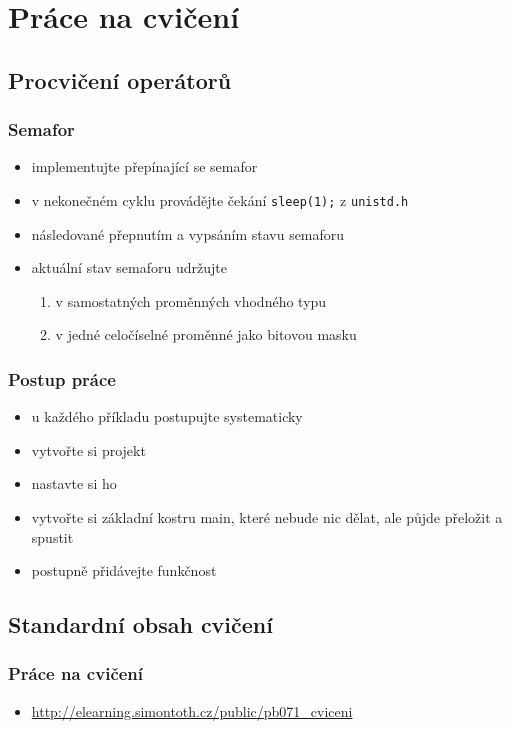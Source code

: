 \section{Práce na cvičení}
\subsection{Procvičení operátorů}

\begin{frame}
	\frametitle{Semafor}
	\begin{itemize}
		\item{implementujte přepínající se semafor}
		\item{v nekonečném cyklu provádějte čekání \texttt{sleep(1);} z \texttt{unistd.h}}
		\item{následované přepnutím a vypsáním stavu semaforu}
		\item{aktuální stav semaforu udržujte}
		\begin{enumerate}
			\item{v samostatných proměnných vhodného typu}
			\item{v jedné celočíselné proměnné jako bitovou masku}
		\end{enumerate}
	\end{itemize}
\end{frame}

\begin{frame}
	\frametitle{Postup práce}
	\begin{itemize}
		\item{u každého příkladu postupujte systematicky}
		\item{vytvořte si projekt}
		\item{nastavte si ho}
		\item{vytvořte si základní kostru main, které nebude nic dělat, ale půjde přeložit a spustit}
		\item{postupně přidávejte funkčnost}
	\end{itemize}
\end{frame}

\subsection{Standardní obsah cvičení}

\begin{frame}
	\frametitle{Práce na cvičení}
	\begin{itemize}
		\item{\href{http://elearning.simontoth.cz/public/pb071\_cviceni}{http://elearning.simontoth.cz/public/pb071\_cviceni}}
	\end{itemize}
\end{frame}




